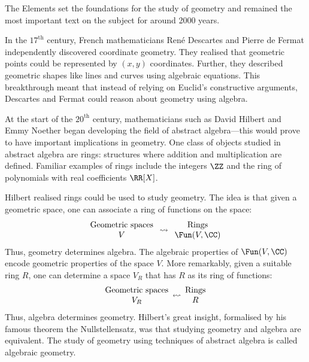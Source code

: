 \documentclass[12pt]{amsart}
\theoremstyle{plain}
\begin{document}
\noindent
The Elements set the foundations for the study of geometry and remained the most important text on the subject for around 2000 years.

In the $17^\text{th}$ century, French mathematicians Ren\'{e} Descartes and Pierre de Fermat independently discovered coordinate geometry.
They realised that geometric points could be represented by $(x, y)$ coordinates.
Further, they described geometric shapes like lines and curves using algebraic equations.
This breakthrough meant that instead of relying on Euclid's constructive arguments, Descartes and Fermat could reason about geometry using algebra.

At the start of the $20^\text{th}$ century, mathematicians such as David Hilbert and Emmy Noether began developing the field of abstract algebra---this would prove to have important implications in geometry.
One class of objects studied in abstract algebra are rings: structures where addition and multiplication are defined.
Familiar examples of rings include the integers $\ZZ$ and the ring of polynomials with real coefficients $\RR[X]$.

Hilbert realised rings could be used to study geometry.
The idea is that given a geometric space, one can associate a ring of functions on the space:
\begin{align*}
\begin{array}{c}
	\text{Geometric spaces} \\
	V
\end{array}
\rightsquigarrow
\begin{array}{c}
	\text{Rings} \\
	\Fun(V, \CC)
\end{array}
\end{align*}
Thus, geometry determines algebra.
The algebraic properties of $\Fun(V, \CC)$ encode geometric properties of the space $V$.
More remarkably, given a suitable ring $R$, one can determine a space $V_R$ that has $R$ as its ring of functions:
\begin{align*}
\begin{array}{c}
	\text{Geometric spaces} \\
	 V_R
\end{array}
\scalebox{-1}[1]{$\rightsquigarrow$}
\begin{array}{c}
	\text{Rings} \\
	R
\end{array}
\end{align*}
Thus, algebra determines geometry.
Hilbert's great insight, formalised by his famous theorem the Nullstellensatz, was that studying geometry and algebra are equivalent.
The study of geometry using techniques of abstract algebra is called algebraic geometry.
\end{document}
